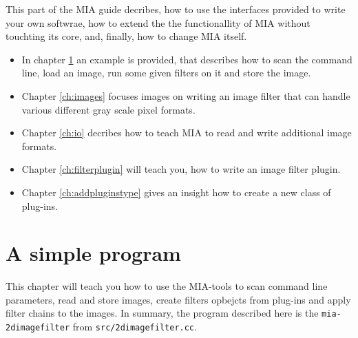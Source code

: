 \documentclass[english, 10pt, a4paper,headsepline,openany]{scrbook}
\begin{document}
This part of the MIA guide decribes, how to use the interfaces provided to write your own softwrae, 
  how to extend the the functionallity of MIA without touchting its core, and, finally, how to 
  change MIA itself. 
\begin{itemize}
\item In chapter \ref{ch:simple} an example is provided, that describes how to scan the command line, load an image, 
  run some given filters on it and store the image. 
\item Chapter \ref{ch:images} focuses images on writing an image filter that can handle various different gray scale pixel formats.
\item Chapter \ref{ch:io} decribes how to teach MIA to read and write additional image formats. 
\item Chapter \ref{ch:filterplugin} will teach you, how to write an image filter plugin. 
\item Chapter \ref{ch:addpluginstype} gives an insight how to create a new class of plug-ins.
\end{itemize}

\section{A simple program}
\label{ch:simple}

This chapter will teach you how to use the MIA-tools to scan command line parameters, read and store images, 
  create filters opbejcts from plug-ins and apply filter chains to the images. 
In summary, the program described here is the \texttt{mia-2dimagefilter} from \texttt{src/2dimagefilter.cc}. 
\end{document}
